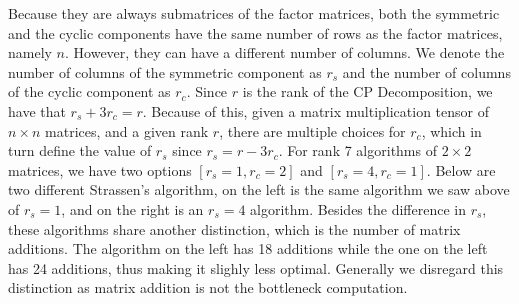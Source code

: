     Because they are always submatrices of the factor matrices, both the
    symmetric and the cyclic components have the same number of rows as the
    factor matrices, namely $n$. However, they can have a different number of
    columns. We denote the number of columns of the symmetric component as $r_s$
    and the number of columns of the cyclic component as $r_c$. Since $r$ is the
    rank of the CP Decomposition, we have that $r_s + 3r_c = r$. Because of
    this, given a matrix multiplication tensor of $n\times n$ matrices, and a
    given rank $r$, there are multiple choices for $r_c$, which in turn define
    the value of $r_s$ since $r_s = r - 3r_c$. For rank 7 algorithms of $2\times
    2$ matrices, we have two options $[r_s = 1, r_c = 2]$ and  $[r_s = 4, r_c =
    1]$. Below are two different Strassen's algorithm, on the left is the same
    algorithm we saw above of $r_s = 1$, and on the right is an $r_s = 4$
    algorithm. Besides the difference in $r_s$, these algorithms share another
    distinction, which is the number of matrix additions. The algorithm on the
    left has 18 additions while the one on the left has 24 additions, thus
    making it slighly less optimal. Generally we disregard this distinction as
    matrix addition is not the bottleneck computation. 

